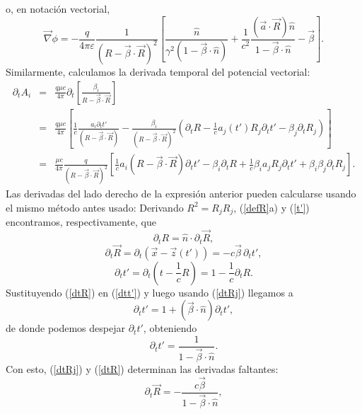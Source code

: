 o, en notación vectorial,
\begin{equation}
 \vec\nabla\phi=-\frac{q}{4\pi\varepsilon}\frac{1}{(R-\vec{\beta}\cdot\vec{R})^2}\left[\frac{\hat{n}}{\gamma^2(1-\vec{\beta}\cdot\hat{n})}+\frac{1}{c^2}\frac{(\vec{a}\cdot\vec{R})\hat{n}}{1-\vec{\beta}\cdot\hat{n}}-\vec\beta\right].
\end{equation}
Similarmente, calculamos la derivada temporal del potencial vectorial:
\begin{eqnarray}
 \partial_t A_i&=&\frac{q\mu c}{4\pi}\partial_t\left[\frac{\beta_i}{R-\vec{\beta}\cdot\vec{R}}\right] \\
&=&\frac{q\mu c}{4\pi}\left[\frac{1}{c}\frac{a_i\partial_tt'}{(R-\vec{\beta}\cdot\vec{R})}-\frac{\beta_i}{(R-\vec{\beta}\cdot\vec{R})^2}\left(\partial_tR-\frac{1}{c}a_j(t')R_j\partial_t t'-\beta_j\partial_tR_j\right)\right] \\
&=&\frac{\mu c}{4\pi}\frac{q}{(R-\vec{\beta}\cdot\vec{R})^2}\left[\frac{1}{c}a_i(R-\vec{\beta}\cdot\vec{R})\partial_tt'-\beta_i\partial_tR+\frac{1}{c}\beta_ia_jR_j\partial_t t'+\beta_i\beta_j\partial_tR_j\right] . \label{dtA}
\end{eqnarray}
Las derivadas del lado derecho de la expresión anterior pueden calcularse usando el mismo método antes usado: Derivando $R^2=R_jR_j$, (\ref{defR}a) y (\ref{t'}) encontramos, respectivamente, que
\begin{equation}
\partial_t R=\hat{n}\cdot\partial_t \vec{R}, \label{dtR}
\end{equation}
\begin{equation}
 \partial_t \vec{R}=\partial_t( \vec{x}-\vec{z}(t'))=-c\vec{\beta}\,\partial_t t', \label{dtRj}
\end{equation}
\begin{equation}
 \partial_t t'=\partial_t(t-\frac{1}{c}R)=1-\frac{1}{c}\partial_tR. \label{dtt'}
\end{equation}
Sustituyendo (\ref{dtR}) en (\ref{dtt'})  y luego usando (\ref{dtRj}) llegamos a
\begin{equation}
 \partial_t t'=1+(\vec{\beta}\cdot\hat{n})\partial_tt',
\end{equation}
de donde podemos despejar $\partial_t t'$, obteniendo
\begin{equation}
 \boxed{\partial_t t'=\frac{1}{1-\vec{\beta}\cdot\hat{n}}.} \label{dtt'2}
\end{equation}
Con esto, (\ref{dtRj}) y (\ref{dtR}) determinan las derivadas faltantes:
\begin{equation}
 \boxed{\partial_t \vec{R}=-\frac{c\vec\beta}{1-\vec{\beta}\cdot\hat{n}},}
\end{equation}

